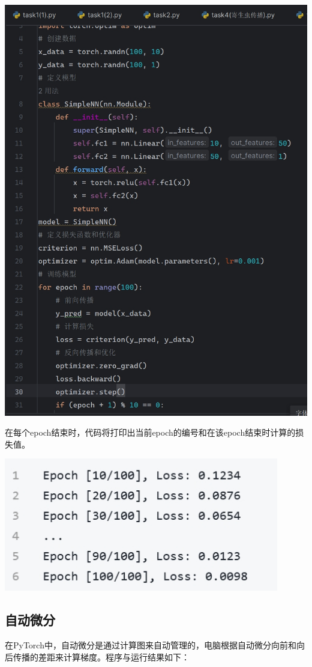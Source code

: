 \documentclass[UTF8,a4paper]{ctexart}
\begin{document}
\begin{sloppypar}
	\includegraphics[width = 14cm]{41}
	
	在每个epoch结束时，代码将打印出当前epoch的编号和在该epoch结束时计算的损失值。
	
	\includegraphics[width = 12cm]{42}
	
	\subsection{自动微分}
	在PyTorch中，自动微分是通过计算图来自动管理的，电脑根据自动微分向前和向后传播的差距来计算梯度。程序与运行结果如下：
	

\end{sloppypar}
\end{document}
